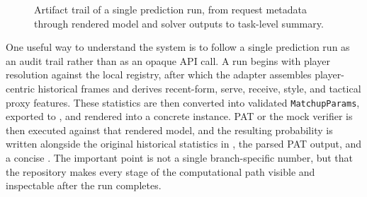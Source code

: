 \documentclass{article}
\begin{document}
\begin{figure}[H]
\centering
{}
\caption{Artifact trail of a single prediction run, from request metadata through rendered model and solver outputs to task-level summary.}
\label{fig:audit_trail}
\end{figure}

One useful way to understand the system is to follow a single prediction run as an audit trail rather than as an opaque API call. A run begins with player resolution against the local registry, after which the adapter assembles player-centric historical frames and derives recent-form, serve, receive, style, and tactical proxy features. These statistics are then converted into validated \texttt{MatchupParams}, exported to , and rendered into a concrete  instance. PAT or the mock verifier is then executed against that rendered model, and the resulting probability is written alongside the original historical statistics in , the parsed PAT output, and a concise . The important point is not a single branch-specific number, but that the repository makes every stage of the computational path visible and inspectable after the run completes.
\end{document}
